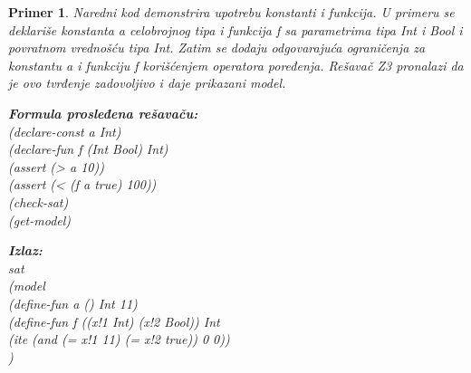\documentclass[12pt,oneside]{memoir}
\newcommand\tab[1][0.5cm]{\hspace*{#1}}
\newtheorem{primer}{Primer}
\begin{document}
\begin{primer} Naredni kod demonstrira upotrebu konstanti i funkcija. U primeru se deklariše konstanta a celobrojnog tipa i funkcija f sa parametrima tipa Int i Bool i povratnom vrednošću tipa Int. Zatim se dodaju odgovarajuća ograničenja za konstantu a i funkciju f korišćenjem operatora poređenja. Rešavač Z3 pronalazi da je ovo tvrđenje zadovoljivo i daje prikazani model. 
\\ 

\hspace{-0.7cm}
\begin{minipage}[b]{0.43\textwidth}
\textbf{Formula prosleđena rešavaču:}\\
(declare-const a Int)\\
(declare-fun f (Int Bool) Int)\\
(assert (> a 10))\\
(assert (< (f a true) 100))\\
(check-sat)\\
(get-model) \\
\end{minipage}
\hspace{0.6cm}
\begin{minipage}[t]{0.5\textwidth}
\vspace{-4.715cm}
\textbf{Izlaz:}
\\sat 
\\(model 
\\\tab(define-fun a () Int 11) 
\\\tab(define-fun f ((x!1 Int) (x!2 Bool)) Int 
\\\tab(ite (and (= x!1 11) (= x!2 true)) 0 0))
\\)
\end{minipage}
\end{primer}
\end{document}
